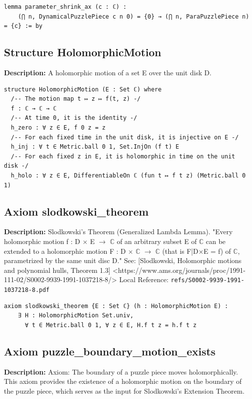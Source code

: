 \begin{lstlisting}[language=Lean]
lemma parameter_shrink_ax (c : ℂ) :
    (⋂ n, DynamicalPuzzlePiece c n 0) = {0} → (⋂ n, ParaPuzzlePiece n) = {c} := by
\end{lstlisting}

\subsection*{Structure HolomorphicMotion}
\textbf{Description:} A holomorphic motion of a set E over the unit disk D.

\begin{lstlisting}[language=Lean]
structure HolomorphicMotion (E : Set ℂ) where
  /-- The motion map t ↦ z ↦ f(t, z) -/
  f : ℂ → ℂ → ℂ
  /-- At time 0, it is the identity -/
  h_zero : ∀ z ∈ E, f 0 z = z
  /-- For each fixed time in the unit disk, it is injective on E -/
  h_inj : ∀ t ∈ Metric.ball 0 1, Set.InjOn (f t) E
  /-- For each fixed z in E, it is holomorphic in time on the unit disk -/
  h_holo : ∀ z ∈ E, DifferentiableOn ℂ (fun t ↦ f t z) (Metric.ball 0 1)
\end{lstlisting}

\subsection*{Axiom slodkowski\_theorem}
\textbf{Description:} Slodkowski's Theorem (Generalized Lambda Lemma).
    "Every holomorphic motion f : D × E $\to$ $\mathbb{C}$ of an arbitrary subset E of $\mathbb{C}$ can be
    extended to a holomorphic motion F : D × $\mathbb{C}$ $\to$ $\mathbb{C}$ (that is F|D×E = f) of $\mathbb{C}$,
    parametrized by the same unit disc D."
    See: [Slodkowski, Holomorphic motions and polynomial hulls, Theorem 1.3] <https://www.ams.org/journals/proc/1991-111-02/S0002-9939-1991-1037218-8/>
    Local Reference: \texttt{refs/S0002-9939-1991-1037218-8.pdf}

\begin{lstlisting}[language=Lean]
axiom slodkowski_theorem {E : Set ℂ} (h : HolomorphicMotion E) :
    ∃ H : HolomorphicMotion Set.univ,
      ∀ t ∈ Metric.ball 0 1, ∀ z ∈ E, H.f t z = h.f t z
\end{lstlisting}

\subsection*{Axiom puzzle\_boundary\_motion\_exists}
\textbf{Description:} Axiom: The boundary of a puzzle piece moves holomorphically.
    This axiom provides the existence of a holomorphic motion on the boundary of the puzzle piece,
    which serves as the input for Slodkowski's Extension Theorem.

